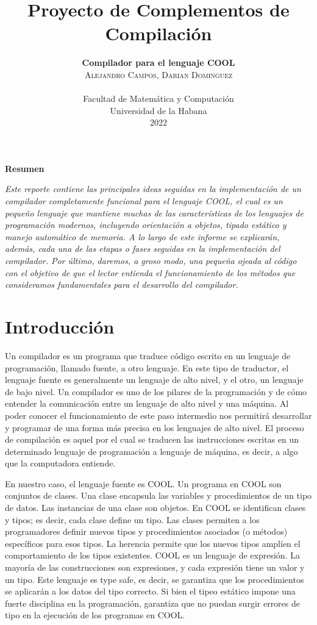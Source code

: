 \documentclass[twoside]{article}
\title{\vspace{-15mm}\fontsize{20pt}{10pt}\selectfont\textbf{Proyecto de Complementos de Compilaci\'on}}
\author{
\large
\textbf{\large Compilador para el lenguaje COOL} \\[1.5cm]
\textsc{Alejandro Campos, Darian Dominguez}\\\\[2mm]
\normalsize Facultad de Matem\'atica y Computaci\'on \\
\normalsize Universidad de la Habana \\
\normalsize 2022 \\[2cm]
\vspace{-5mm}
}
\date{}
\begin{document}
\maketitle

\thispagestyle{fancy} 

\begin{center}
\textbf{Resumen}
\end{center}
\noindent \textit{Este reporte contiene las principales ideas seguidas en la implementaci\'on de un compilador completamente funcional para el lenguaje COOL, el cual es un peque\~no lenguaje que mantiene muchas de las caracter\'isticas de los lenguajes de programaci\'on modernos, incluyendo orientaci\'on a objetos, tipado est\'atico y manejo autom\'atico de memoria. A lo largo de este informe se explicar\'an, adem\'as, cada una de las etapas o fases seguidas en la implementaci\'on del compilador. Por \'ultimo, daremos, a groso modo, una peque\~na ojeada al c\'odigo con el objetivo de que el lector entienda el funcionamiento de los m\'etodos que consideramos fundamentales para el desarrollo del compilador.}\\[0.5cm]

\section{Introducci\'on}
Un compilador es un programa que traduce c\'odigo escrito en un lenguaje de programaci\'on, llamado fuente, a otro lenguaje. En este tipo de traductor, el lenguaje fuente es generalmente un lenguaje de alto nivel, y el otro, un lenguaje de bajo nivel. Un compilador es uno de los pilares de la programaci\'on y de c\'omo entender la comunicaci\'on entre un lenguaje de alto nivel y una m\'aquina. Al poder conocer el funcionamiento de este paso intermedio nos permitir\'a desarrollar y programar de una forma m\'as precisa en los lenguajes de alto nivel. El proceso de compilaci\'on es aquel por el cual se traducen las instrucciones escritas en un determinado lenguaje de programaci\'on a lenguaje de m\'aquina, es decir, a algo que la computadora entiende.

En nuestro caso, el lenguaje fuente es COOL. Un programa en COOL son conjuntos de clases. Una clase encapsula las variables y procedimientos de un tipo de datos. Las instancias de una clase son objetos. En COOL se identifican clases y tipos; es decir, cada clase define un tipo. Las clases permiten a los programadores definir nuevos tipos y procedimientos asociados (o m\'etodos) espec\'ificos para esos tipos. La herencia permite que los nuevos tipos ampl\'ien el comportamiento de los tipos existentes. COOL es un lenguaje de expresi\'on. La mayor\'ia de las construcciones son expresiones, y cada expresi\'on tiene un valor y un tipo. Este lenguaje es type safe, es decir, se garantiza que los procedimientos se aplicar\'an a los datos del tipo correcto. Si bien el tipeo est\'atico impone una fuerte disciplina en la programaci\'on, garantiza que no puedan surgir errores de tipo en la ejecuci\'on de los programas en COOL.
\end{document}
